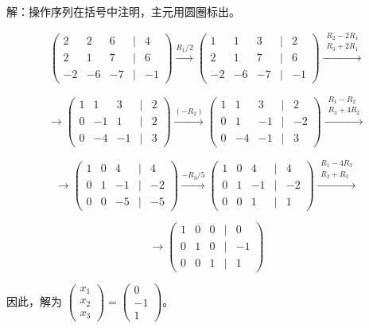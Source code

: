 解：操作序列在括号中注明，主元用圆圈标出。

\[
\begin{pmatrix}
	\boxed{2} & 2 & 6 & \big| & 4 \\
	2 & 1 & 7 & \big| & 6 \\
	-2 & -6 & -7 & \big| & -1
\end{pmatrix}
\xrightarrow{R_1/2}
\begin{pmatrix}
	\boxed{1} & 1 & 3 & \big| & 2 \\
	2 & 1 & 7 & \big| & 6 \\
	-2 & -6 & -7 & \big| & -1
\end{pmatrix}
\xrightarrow{\substack{R_2 - 2R_1 \\ R_3 + 2R_1}}
\]

\[
\rightarrow
\begin{pmatrix}
	\boxed{1} & 1 & 3 & \big| & 2 \\
	0 & -1 & 1 & \big| & 2 \\
	0 & -4 & -1 & \big| & 3
\end{pmatrix}
\xrightarrow{(-R_2)}
\begin{pmatrix}
	1 & 1 & 3 & \big| & 2 \\
	0 & \boxed{1} & -1 & \big| & -2 \\
	0 & -4 & -1 & \big| & 3
\end{pmatrix}
\xrightarrow{\substack{R_1 - R_2 \\ R_3 + 4R_2}}
\]

\[
\rightarrow
\begin{pmatrix}
	1 & 0 & 4 & \big| & 4 \\
	0 & \boxed{1} & -1 & \big| & -2 \\
	0 & 0 & -5 & \big| & -5
\end{pmatrix}
\xrightarrow{-R_3/5}
\begin{pmatrix}
	1 & 0 & 4 & \big| & 4 \\
	0 & 1 & -1 & \big| & -2 \\
	0 & 0 & \boxed{1} & \big| & 1
\end{pmatrix}
\xrightarrow{\substack{R_1 - 4R_3 \\ R_2 + R_3}}
\]

\[
\rightarrow
\begin{pmatrix}
	1 & 0 & 0 & \big| & 0 \\
	0 & 1 & 0 & \big| & -1 \\
	0 & 0 & \boxed{1} & \big| & 1
\end{pmatrix}
\]

因此，解为 \(\begin{pmatrix} x_1 \\ x_2 \\ x_3 \end{pmatrix} = \begin{pmatrix} 0 \\ -1 \\ 1 \end{pmatrix}\)。

